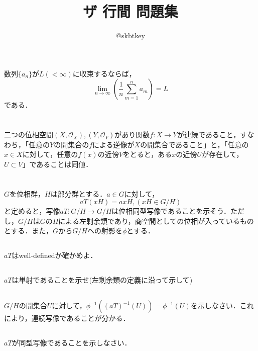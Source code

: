 \documentclass[12pt, a4paper]{jsarticle}
\title{ザ 行間 問題集}
\author{@skbtkey}
\theoremstyle{definition}
\begin{document}
\maketitle
{}

\section{}
数列$\{ a_n \}$が$L (< \infty)$に収束するならば，
\[
\lim_{n \to \infty} \left( \frac{1}{n} \sum_{m=1}^{n}a_m \right) = L
\]
である．

\section{}
二つの位相空間$(X, \mathcal{O}_{X}),(Y,\mathcal{O}_{Y})$があり関数$f \colon X \rightarrow Y$が連続であること，すなわち，「任意の$Y$の開集合の$f$による逆像が$X$の開集合であること」と，「任意の$x \in X$に対して，任意の$f(x)$の近傍$V$をとると，ある$x$の近傍$U$が存在して，$U \subset V$」であることは同値．

\section{}
$G$を位相群，$H$は部分群とする．$a \in G$に対して，
\[
aT(xH) = axH , (xH \in G/H)
\]
と定めると，写像$aT \colon G/H \rightarrow G/H$は位相同型写像であることを示そう．ただし，$G/H$は$G$の$H$による左剰余類であり，商空間としての位相が入っているものとする．また，$G$から$G/H$への射影を$\phi$とする．
\subsection{}
$aT$はwell-definedか確かめよ．
\subsection{}
$aT$は単射であることを示せ(左剰余類の定義に沿って示して)
\subsection{}
$G/H$の開集合$U$に対して，$\phi^{-1}((aT)^{-1}(U)) = \phi^{-1}(U)$を示しなさい．これにより，連続写像であることが分かる．
\subsection{}
$aT$が同型写像であることを示しなさい．
\end{document}
